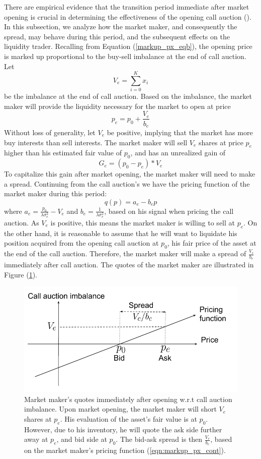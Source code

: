 \documentclass{article}
\begin{document}
There are empirical evidence that the transition period immediate after market opening is crucial in determining the effectiveness of the opening call auction (\cite{Pagano2013}). In this subsection, we analyze how the market maker, and consequently the spread, may behave during this period, and the subsequent effects on the liquidity trader. Recalling from Equation (\ref{markup_px_eqb}), the opening price is marked up proportional to the buy-sell imbalance at the end of call auction. Let
\[
  V_e = \sum_{i=0}^K x_i
\]
be the imbalance at the end of call auction. Based on the imbalance, the market maker will provide the liquidity necessary for the market to open at price
\[
  p_e = p_0 + \frac{V_e}{b_e}
\]
Without loss of generality, let $V_e$ be positive, implying that the market has more buy interests than sell interests. The market maker will sell $V_e$ shares at price $p_e$ higher than his estimated fair value of $p_0$, and has an unrealized gain of
\[
  G_e = (p_0 - p_e) * V_e
\]
To capitalize this gain after market opening, the market maker will need to make a spread. Continuing from the call auction's we have the pricing function of the market maker during this period:
\[
  q(p) = a_e - b_e p
\]
where $a_e = \frac{p_0}{\lambda \sigma_e^2} - V_e$ and $b_e=\frac{1}{\lambda \sigma_e^2}$, based on his signal when pricing the call auction. As $V_e$ is positive, this means the market maker is willing to sell at $p_e$. On the other hand, it is reasonable to assume that he will want to liquidate his position acquired from the opening call auction at $p_0$, his fair price of the asset at the end of the call auction. Therefore, the market maker will make a spread of $\frac{V_e}{b_e}$ immediately after call auction. The quotes of the market maker are illustrated in Figure (\ref{fig:mm_pricing_transition}).

\begin{figure}[h]
  \includegraphics[width=\textwidth]{MMPricingTransition}
  \caption{Market maker's quotes immediately after opening w.r.t call auction imbalance. Upon market opening, the market maker will short $V_e$ shares at $p_e$. His evaluation of the asset's fair value is at $p_0$. However, due to his inventory, he will quote the ask side further away at $p_e$, and bid side at $p_0$. The bid-ask spread is then $\frac{V_e}{b_e}$, based on the market maker's pricing function (\ref{eqn:markup_px_cont}).}
  \label{fig:mm_pricing_transition}
\end{figure}
\end{document}
